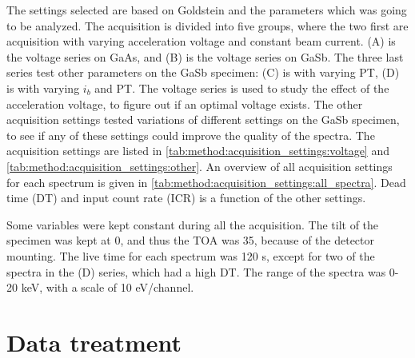 The settings selected are based on Goldstein \cite{goldstein_scanning_2018} and the parameters which was going to be analyzed.
The acquisition is divided into five groups, where the two first are acquisition with varying acceleration voltage and constant beam current.
(A) is the voltage series on GaAs, and (B) is the voltage series on GaSb.
The three last series test other parameters on the GaSb specimen: (C) is with varying PT, (D) is with varying $i_b$ and PT. %
The voltage series is used to study the effect of the acceleration voltage, to figure out if an optimal voltage exists.
The other acquisition settings tested variations of different settings on the GaSb specimen, to see if any of these settings could improve the quality of the spectra.
The acquisition settings are listed in \cref{tab:method:acquisition_settings:voltage} and \cref{tab:method:acquisition_settings:other}.
An overview of all acquisition settings for each spectrum is given in \cref{tab:method:acquisition_settings:all_spectra}.
Dead time (DT) and input count rate (ICR) is a function of the other settings.


Some variables were kept constant during all the acquisition.
The tilt of the specimen was kept at 0\textdegree, and thus the TOA was 35\textdegree, because of the detector mounting.
The live time for each spectrum was 120 s, except for two of the spectra in the (D) series, which had a high DT.
The range of the spectra was 0-20 keV, with a scale of 10 eV/channel.






































\section{Data treatment}
\label{method:data_treatment}

